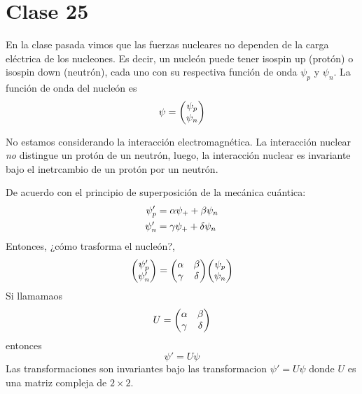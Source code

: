 \section{Clase 25}
En la clase pasada vimos que las fuerzas nucleares no dependen de la carga eléctrica de los nucleones. Es decir, un nucleón puede tener isospin up (protón) o isospin down (neutrón), cada uno con su respectiva función de onda $\psi_p$ y $\psi_n $. La función de onda del nucleón es
\begin{equation}
  \psi =\mqty(\psi_p\\\psi_n)
\end{equation}

No estamos considerando la interacción electromagnética. La interacción nuclear \textit{no} distingue un protón de un neutrón, luego, la interacción nuclear es invariante bajo el inetrcambio de un protón por un neutrón.


De acuerdo con el principio de superposición de la mecánica cuántica:
\begin{align}
  \psi_p'&=\alpha \psi_+ +\beta\psi_n\\
  \psi_n'&=\gamma  \psi_+ +\delta \psi_n
\end{align}
Entonces, ¿cómo trasforma el nucleón?,
\begin{align}
  \mqty(\psi_p'\\ \psi_n')=\mqty(\a&\b \\\g&\d )\mqty(\psi_p\\\psi_n)
\end{align}
Si llamamaos 
\begin{equation}
  U=\mqty(\a&\b \\\g&\d )
\end{equation}
entonces
\begin{equation}
\boxed{  \psi'=U\psi}
\end{equation}
Las transformaciones son invariantes bajo las transformacion $\psi'=U\psi$ donde $U$ es una matriz compleja de $2\times 2$.

